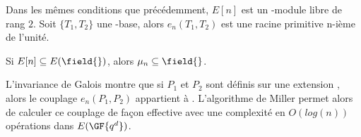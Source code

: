 
\begin{corollaire}
Dans les mêmes conditions que précédemment, $E[n]$ est un -module libre de rang $2$. Soit $\{T_1, T_2\}$ une -base, alors $e_n(T_1, T_2)$ est une racine primitive n-ième de l'unité.
\end{corollaire}

\begin{corollaire}
Si $E[n] \subseteq E(\field{})$, alors $\mu_n \subseteq \field{}$.
\end{corollaire}

L'invariance de Galois montre que si $P_1$ et $P_2$ sont définis sur une extension , alors le couplage $e_n(P_1, P_2)$ appartient à . L'algorithme de Miller permet alors de calculer ce couplage de façon effective avec une complexité en $O(log(n))$ opérations dans $E(\GF{q^d})$.



